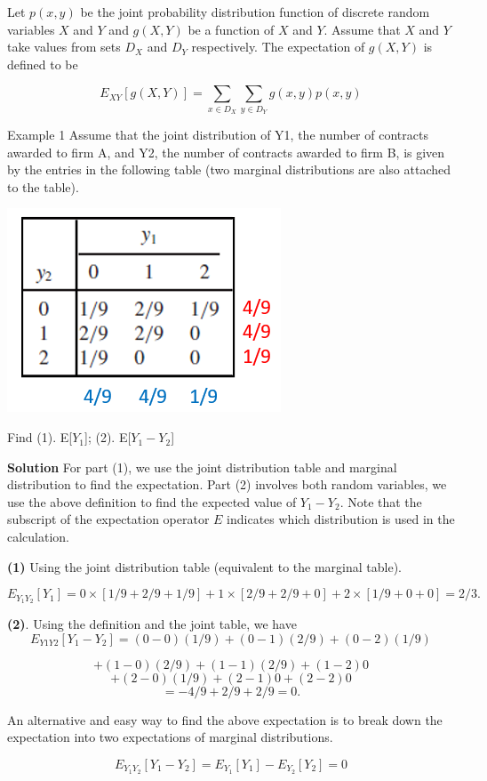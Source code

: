 \documentclass[
]{book}
\begin{document}
Let \(p(x,y)\) be the joint probability distribution function of discrete random variables \(X\) and \(Y\) and \(g(X, Y)\) be a function of \(X\) and \(Y\). Assume that \(X\) and \(Y\) take values from sets \(D_X\) and \(D_Y\) respectively. The expectation of \(g(X,Y)\) is defined to be

\[
E_{XY}[g(X,Y)] = \sum_{x\in D_X} \sum_{y\in D_Y} g(x,y) p(x,y)
\]

Example 1 Assume that the joint distribution of Y1, the number of contracts awarded to firm A, and Y2, the number of contracts awarded to firm B, is given by the entries in the following table (two marginal distributions are also attached to the table).

\begin{center}\includegraphics[width=0.35\linewidth]{topic08/expectationDiscreteExample01} \end{center}

Find (1). E{[}\(Y_1\){]}; (2). E{[}\(Y_1-Y_2\){]}

\textbf{Solution} For part (1), we use the joint distribution table and marginal distribution to find the expectation. Part (2) involves both random variables, we use the above definition to find the expected value of \(Y_1-Y_2\). Note that the subscript of the expectation operator \(E\) indicates which distribution is used in the calculation.

\textbf{(1)} Using the joint distribution table (equivalent to the marginal table).

\[
E_{Y_1Y_2}[Y_1] = 0\times [1/9 + 2/9 + 1/9] + 1\times[2/9 + 2/9 + 0] + 2\times [1/9 + 0 + 0]  = 2/3.
\]

\textbf{(2)}. Using the definition and the joint table, we have
\[
E_{Y1Y2}[Y_1-Y_2] = (0-0)(1/9) + (0-1)(2/9) + (0-2)(1/9)
\]

\[
+ (1-0)(2/9) + (1-1)(2/9) + (1-2)0 
\]
\[
+ (2-0)(1/9) + (2-1)0 + (2-2)0 
\]
\[
= -4/9 + 2/9 + 2/9  = 0.
\]

An alternative and easy way to find the above expectation is to break down the expectation into two expectations of marginal distributions.

\[
E_{Y_1Y_2}[Y_1 - Y_2] = E_{Y_1}[Y_1] - E_{Y_2}[Y_2] = 0
\]
\end{document}
